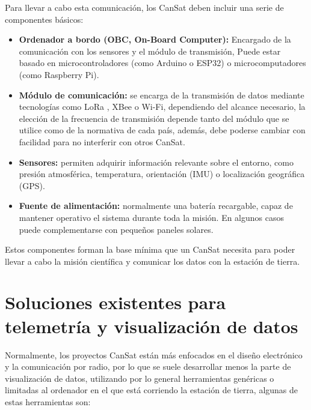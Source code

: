 Para llevar a cabo esta comunicación, los CanSat deben incluir una serie de componentes básicos:
\begin{itemize}
    \item \textbf{Ordenador a bordo (OBC, On-Board Computer):} Encargado de la comunicación con los sensores y el módulo de transmisión, Puede estar basado en microcontroladores (como Arduino o ESP32) o microcomputadores (como Raspberry Pi).
    \item \textbf{Módulo de comunicación:} se encarga de la transmisión de datos mediante tecnologías como LoRa \cite{lora2015overview}, XBee \cite{xbee} o Wi-Fi, dependiendo del alcance necesario,
    la elección de la frecuencia de transmisión depende tanto del módulo que se utilice como de la normativa de cada país, además, debe poderse cambiar con facilidad para no interferir con otros CanSat.
    \item \textbf{Sensores:} permiten adquirir información relevante sobre el entorno, como presión atmosférica, temperatura, orientación (IMU) o localización geográfica (GPS).
    \item \textbf{Fuente de alimentación:} normalmente una batería recargable, capaz de mantener operativo el sistema durante toda la misión. En algunos casos puede complementarse con pequeños paneles solares.
\end{itemize}

Estos componentes forman la base mínima que un CanSat necesita para poder llevar a cabo la misión científica y comunicar los datos con la estación de tierra.


\section{Soluciones existentes para telemetría y visualización de datos}
Normalmente, los proyectos CanSat están más enfocados en el diseño electrónico y la comunicación por radio,
por lo que se suele desarrollar menos la parte de visualización de datos, utilizando por lo general herramientas genéricas
o limitadas al ordenador en el que está corriendo la estación de tierra, algunas de estas herramientas son:

